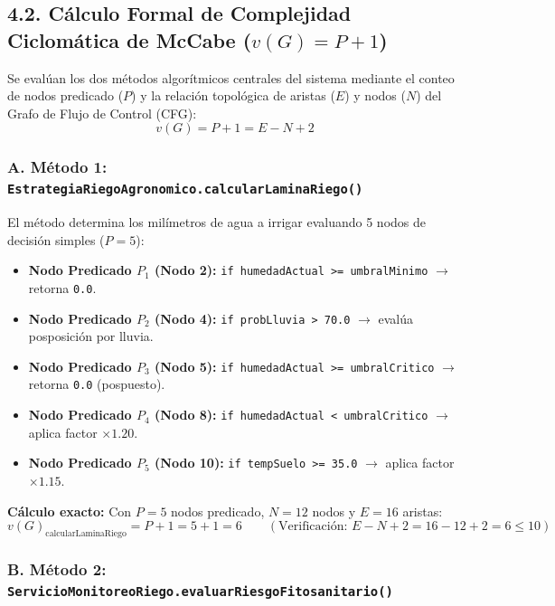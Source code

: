 \documentclass[12pt,letterpaper]{report}
\begin{document}
\subsection*{4.2. Cálculo Formal de Complejidad Ciclomática de McCabe ($v(G) = P + 1$)}

Se evalúan los dos métodos algorítmicos centrales del sistema mediante el conteo de nodos predicado ($P$) y la relación topológica de aristas ($E$) y nodos ($N$) del Grafo de Flujo de Control (CFG):
\[
    v(G) = P + 1 = E - N + 2
\]

\subsubsection*{A. Método 1: \texttt{EstrategiaRiegoAgronomico.calcularLaminaRiego()}}

El método determina los milímetros de agua a irrigar evaluando 5 nodos de decisión simples ($P = 5$):
\begin{itemize}
    \item \textbf{Nodo Predicado $P_1$ (Nodo 2):} \texttt{if humedadActual >= umbralMinimo} $\rightarrow$ retorna \texttt{0.0}.
    \item \textbf{Nodo Predicado $P_2$ (Nodo 4):} \texttt{if probLluvia > 70.0} $\rightarrow$ evalúa posposición por lluvia.
    \item \textbf{Nodo Predicado $P_3$ (Nodo 5):} \texttt{if humedadActual >= umbralCritico} $\rightarrow$ retorna \texttt{0.0} (pospuesto).
    \item \textbf{Nodo Predicado $P_4$ (Nodo 8):} \texttt{if humedadActual < umbralCritico} $\rightarrow$ aplica factor $\times 1.20$.
    \item \textbf{Nodo Predicado $P_5$ (Nodo 10):} \texttt{if tempSuelo >= 35.0} $\rightarrow$ aplica factor $\times 1.15$.
\end{itemize}

\noindent\textbf{Cálculo exacto:} Con $P = 5$ nodos predicado, $N = 12$ nodos y $E = 16$ aristas:
\[
    v(G)_{\text{calcularLaminaRiego}} = P + 1 = 5 + 1 = 6 \qquad \left(\text{Verificación: } E - N + 2 = 16 - 12 + 2 = 6 \le 10\right)
\]

\subsubsection*{B. Método 2: \texttt{ServicioMonitoreoRiego.evaluarRiesgoFitosanitario()}}
\end{document}
